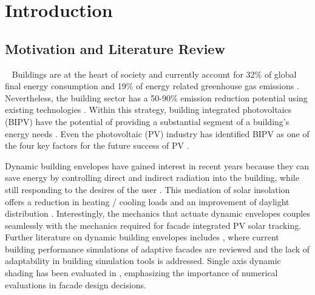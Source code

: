 \chapter{Introduction}


\section{Motivation and Literature Review}\
\label{ch:motivation}
	Buildings are at the heart of society and currently account for 32\% of global final energy consumption and 19\% of energy related greenhouse gas emissions \cite{IPCC}. Nevertheless, the building sector has a 50-90\% emission reduction potential using existing technologies \cite{IPCC}. Within this strategy, building integrated photovoltaics (BIPV) have the potential of providing a substantial segment of a building's energy needs \cite{defaix2012technical}. Even the photovoltaic (PV) industry has identified BIPV as one of the four key factors for the future success of PV \cite{raugei2009life}. 



	Dynamic building envelopes have gained interest in recent years because they can save energy by controlling direct and indirect radiation into the building, while still responding to the desires of the user \cite{loonen2013climate}. This mediation of solar insolation offers a reduction in heating / cooling loads and an improvement of daylight distribution \cite{rossi2012adaptive}. Interestingly, the mechanics that actuate dynamic envelopes couples seamlessly with the mechanics required for facade integrated PV solar tracking. Further literature on dynamic building envelopes includes \cite{loonen16}, where current building performance simulations of adaptive facades are reviewed and the lack of adaptability in building simulation tools is addressed. Single axis dynamic shading has been evaluated in \cite{nielsen2011quantifying}, emphasizing the importance of numerical evaluations in facade design decisions. 

